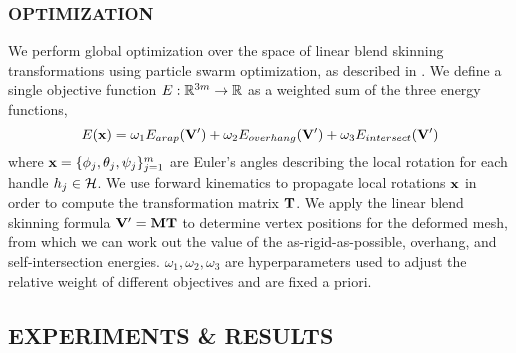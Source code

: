 



\subsubsection*{OPTIMIZATION}

We perform global optimization over the space of linear blend skinning transformations using particle swarm optimization, as described in \cite{jacobson_matryoshka_2017}. We define a single objective function $E: \mathbb{R}^{3m} \to \mathbb{R}$ as a weighted sum of the three energy functions,
\[
    E(\mathbf{x}) = \omega_1 E_{arap}(\mathbf{V}') + \omega_2 E_{overhang}(\mathbf{V}') + \omega_3 E_{intersect}(\mathbf{V}')
\]
where $\mathbf{x} = \{ \phi_j, \theta_j, \psi_j \}_{j=1}^m$ are Euler's angles describing the local rotation for each handle $h_j \in \mathcal{H}$. We use forward kinematics to propagate local rotations $\mathbf{x}$ in order to compute the transformation matrix $\mathbf{T}$. We apply the linear blend skinning formula $\mathbf{V}' = \mathbf{M} \mathbf{T}$ to determine vertex positions for the deformed mesh, from which we can work out the value of the as-rigid-as-possible, overhang, and self-intersection energies. $\omega_1,\omega_2,\omega_3$ are hyperparameters used to adjust the relative weight of different objectives and are fixed a priori.

\subsection*{EXPERIMENTS \& RESULTS}

